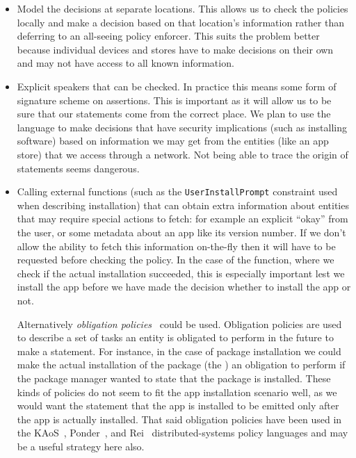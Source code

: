 \documentclass[a4paper,sfsidenotes]{%
  article%
}
\begin{document}
\begin{itemize}

  \item Model the decisions at separate locations.  This allows us to check the
    policies locally and make a decision based on that location's information
    rather than deferring to an all-seeing policy enforcer.  This suits the
    problem better because individual devices and stores have to make decisions
    on their own and may not have access to all known information.

  \item Explicit speakers that can be checked. In practice this means some form
    of signature scheme on assertions.  This is important as it will allow us to
    be sure that our statements come from the correct place.  We plan to use the
    language to make decisions that have security implications (such as
    installing software) based on information we may get from the entities (like
    an app store) that we access through a network.  Not being able to trace the
    origin of statements seems dangerous.

  \item Calling external functions (such as the
    \texttt{UserInstallPrompt} constraint used when describing installation)
    that can obtain extra information about entities that may require special
    actions to fetch: for example an explicit ``okay'' from the user, or some
    metadata about an app like its version number.  If we don't allow the ability
    to fetch this information on-the-fly then it will have to be requested
    before checking the policy.  In the case of the  function,
    where we check if the actual installation succeeded, this is especially
    important lest we install the app before we have made the decision whether
    to install the app or not.  
    
    Alternatively \emph{obligation policies}~\cite{Gama:2005tp,Gelfond:2008cl}
    could be used.  Obligation policies are used to describe a set of tasks an
    entity is obligated to perform in the future to make a statement.  For
    instance, in the case of package installation we could make the actual
    installation of the package (the ) an
    obligation to perform if the package manager wanted to state that the
    package is installed.  These kinds of policies do not seem to fit the app
    installation scenario well, as we would want the statement that the app is
    installed to be emitted only after the app is actually installed.  That said
    obligation policies have been used in the KAoS~\cite{Uszok:2003bn},
    Ponder~\cite{Damianou:2001ho,Twidle:2009fj}, and Rei~\cite{Kagal:2002ta}
    distributed-systems policy languages and may be a useful strategy here also.


\end{itemize}
\end{document}
